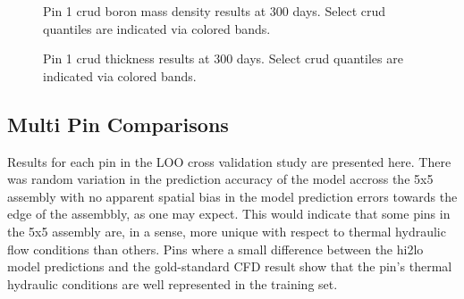 \begin{figure}[H]%
    \centering
    \qquad
    \caption[Pin 1 crud boron mass density results at 300 days]{Pin 1 crud boron mass density results at 300 days.  Select crud quantiles are indicated via colored bands.}%
    \label{fig:dist_hi2loimppinzbmass}
\end{figure}


\begin{figure}[H]%
    \centering
    \qquad
    \caption[Pin 1 crud thickness results at 300 days]{Pin 1 crud thickness results at 300 days.  Select crud quantiles are indicated via colored bands.}%
    \label{fig:dist_hi2loimppinzcthick}
\end{figure}



\subsection{Multi Pin Comparisons}
\label{sec:multi_pin_result}

Results for each pin in the LOO cross validation study are presented here.  There was random variation in the prediction accuracy of the model accross the 5x5 assembly with no apparent spatial bias in the model prediction errors towards the edge of the assembbly, as one may expect.  This would indicate that some pins in the 5x5 assembly are, in a sense, more unique with respect to thermal hydraulic flow conditions than others.  Pins where a small difference between the hi2lo model predictions and the gold-standard CFD result show that the pin's thermal hydraulic conditions are well represented in the training set.

